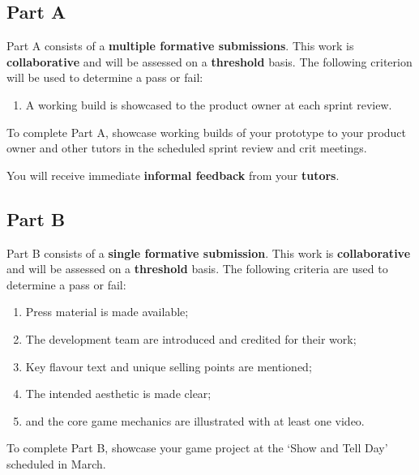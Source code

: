 \documentclass{../../fal_assignment}
\begin{document}

\subsection*{Part A}

Part A consists of a \textbf{multiple formative submissions}. This work is \textbf{collaborative} and will be assessed on a \textbf{threshold} basis. The following criterion will be used to determine a pass or fail:

\begin{enumerate}[label=(\alph*)]
	\item A working build is showcased to the product owner at each sprint review.
\end{enumerate}

To complete Part A, showcase working builds of your prototype to your product owner and other tutors in the scheduled sprint review and crit meetings.

You will receive immediate \textbf{informal feedback} from your \textbf{tutors}.

\subsection*{Part B}

Part B consists of a \textbf{single formative submission}. This work is \textbf{collaborative} and will be assessed on a \textbf{threshold} basis. The following criteria are used to determine a pass or fail:

\begin{enumerate}[label=(\alph*)]
	\item Press material is made available;
	\item The development team are introduced and credited for their work;
	\item Key flavour text and unique selling points are mentioned;
	\item The intended aesthetic is made clear;
	\item and the core game mechanics are illustrated with at least one video.
\end{enumerate}

To complete Part B, showcase your game project at the `Show and Tell Day' scheduled in March.
\end{document}
